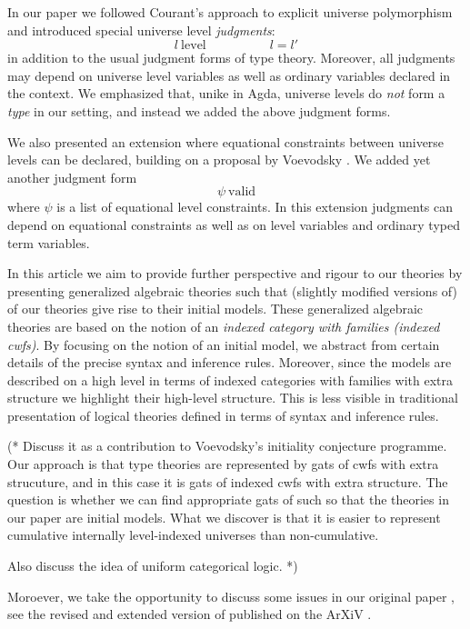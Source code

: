 \documentclass[11pt,a4paper]{article}
\theoremstyle{definition}
\begin{document}
In our paper we followed Courant's approach \cite{Courant02} to explicit universe polymorphism and introduced special universe level {\em judgments}:
$$
l\ \mathrm{level}
\hspace{5em}
l = l'
$$
in addition to the usual judgment forms of type theory. Moreover, all judgments may depend on universe level variables as well as ordinary variables declared in the context. We emphasized that, unike in Agda, universe levels do {\em not} form a {\em type} in our setting, and instead we added the above judgment forms. 

We also presented an extension where equational constraints between universe levels can be declared, building on a proposal by Voevodsky \cite{VV}. We added yet another judgment form
$$
\psi\ \mathrm{valid}
$$
where $\psi$ is a list of equational level constraints. 
In this extension judgments can depend on equational constraints as well as on level variables and ordinary typed term variables.

In this article we aim to provide further perspective and rigour to our theories by presenting generalized algebraic theories such that (slightly modified versions of) of our theories give rise to their initial models. These generalized algebraic theories are based on the notion of an {\em indexed category with families (indexed cwfs)}.
By focusing on the notion of an initial model, we abstract from certain details of the precise syntax and inference rules.  Moreover, since the models are described on a high level in terms of indexed categories with families with extra structure we highlight their high-level structure. This is less visible in traditional presentation of logical theories defined in terms of syntax and inference rules. 

(* Discuss it as a contribution to Voevodsky's initiality conjecture programme. Our approach is that type theories are represented by gats of cwfs with extra strucuture, and in this case it is gats of indexed cwfs with extra structure. The question is whether we can find appropriate gats of such so that the theories in our paper are initial models. What we discover is that it is easier to represent cumulative internally level-indexed universes than non-cumulative.

Also discuss the idea of uniform categorical logic. *) 
 
Moroever, we take the opportunity to discuss some issues in our original paper \cite{BezemCDE22}, see the revised and extended version of published on the ArXiV \cite{BezemCDE22:revised}.
\end{document}
